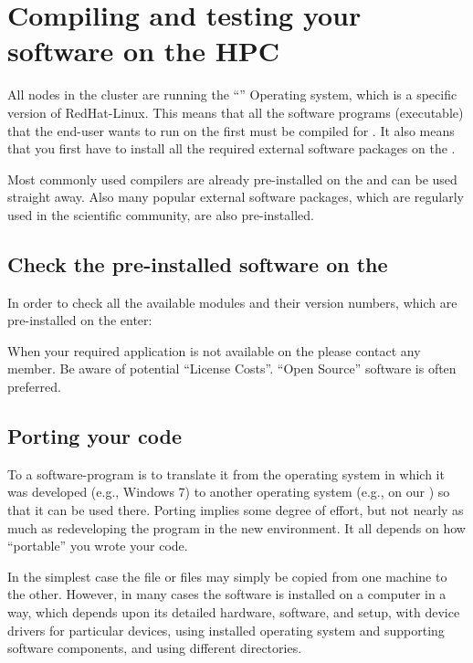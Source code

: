 \chapter{Compiling and testing your software on the HPC}
\label{ch:compiling-and-testing-your-software-on-the-hpc}

All nodes in the \hpc cluster are running the ``\operatingsystem'' Operating
system, which is a specific version of RedHat-Linux. This means that all the
software programs (executable) that the end-user wants to run on the \hpc first
must be compiled for \operatingsystem.  It also means that you first have to
install all the required external software packages on the \hpc.

Most commonly used compilers are already pre-installed on the \hpc and can
be used straight away. Also many popular external software packages, which are
regularly used in the scientific community, are also pre-installed.

\section{Check the pre-installed software on the \hpc}

In order to check all the available modules and their version numbers, which
are pre-installed on the \hpc enter:


When your required application is not available on the \hpc please contact any
\hpc member. Be aware of potential ``License Costs''.  ``Open Source'' software
is often preferred.

\section{Porting your code}

To  a software-program is to translate it from the operating
system in which it was developed (e.g., Windows 7) to another operating system
(e.g., \operatingsystembase on our \hpc) so that it can be used there. Porting
implies some degree of effort, but not nearly as much as redeveloping the
program in the new environment.  It all depends on how ``portable'' you wrote
your code.

In the simplest case the file or files may simply be copied from one machine to
the other. However, in many cases the software is installed on a computer in a
way, which depends upon its detailed hardware, software, and setup, with device
drivers for particular devices, using installed operating system and supporting
software components, and using different directories.

